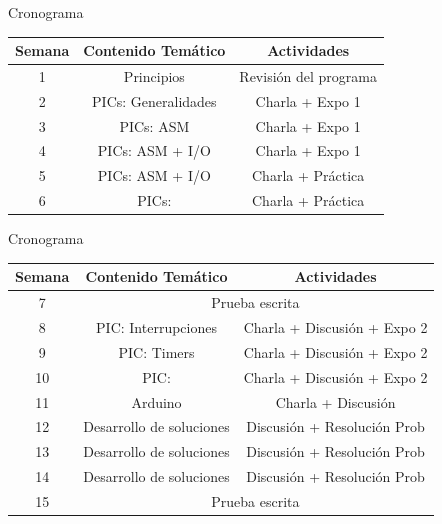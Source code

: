 \documentclass[handout,xcolor=dvipsnames]{beamer}
\begin{document}
\begin{frame}{Cronograma}
 \begin{center}
 {\small
  \begin{tabular}{|c|c|c|}\hline
  
   Semana 	& \multicolumn{1}{c|}{Contenido Temático} & \multicolumn{1}{c|}{Actividades} \\ \hline \hline
   1 		& Principios 		&  Revisión del programa \\ \hline
   2 		& PICs: Generalidades & Charla + Expo 1 \\ \hline
   3 		& PICs: ASM			& Charla + Expo 1\\ \hline
   4 		& PICs: ASM + I/O  		& Charla + Expo 1 \\ \hline
   5		& PICs: ASM	+ I/O	& Charla + Práctica \\ \hline
   6 		& PICs: 	& Charla + Práctica \\ \hline

  
  \end{tabular}}
 \end{center}
\end{frame}

\begin{frame}{Cronograma}
 \begin{center}
 {\small
  \begin{tabular}{|c|c|c|}\hline
  
   Semana 	& \multicolumn{1}{c|}{Contenido Temático} & \multicolumn{1}{c|}{Actividades} \\ \hline \hline
   7 		& \multicolumn{2}{c|}{Prueba escrita} \\ \hline
   8 		& PIC: Interrupciones	& Charla + Discusión + Expo 2 \\ \hline
   9 		& PIC: Timers 		& Charla + Discusión + Expo 2\\ \hline
   10 		& PIC: 		& Charla + Discusión + Expo 2 \\ \hline
   11		& Arduino		& Charla + Discusión  \\ \hline
   12 		& Desarrollo de soluciones & Discusión + Resolución Prob \\ \hline
   13 		& Desarrollo de soluciones & Discusión + Resolución Prob \\ \hline
   14		& Desarrollo de soluciones & Discusión + Resolución Prob \\ \hline
   15 		& \multicolumn{2}{c|}{Prueba escrita}  \\ \hline
  \end{tabular}}
 \end{center}
\end{frame}
\end{document}
